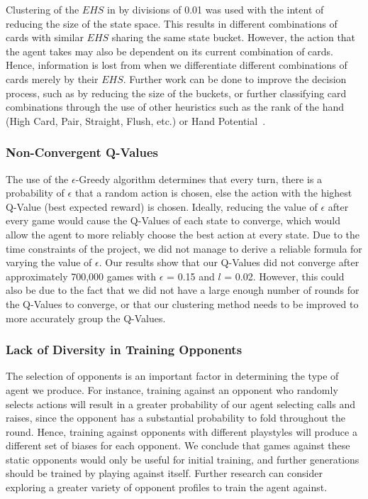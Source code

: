 \documentclass{article}
\begin{document}
Clustering of the $EHS$ in by divisions of 0.01 was used with the intent of reducing the size of the state space. This results in different combinations of cards with similar $EHS$ sharing the same state bucket. However, the action that the agent takes may also be dependent on its current combination of cards. Hence, information is lost from when we differentiate different combinations of cards merely by their $EHS$. Further work can be done to improve the decision process, such as by reducing the size of the buckets, or further classifying card combinations through the use of other heuristics such as the rank of the hand (High Card, Pair, Straight, Flush, etc.) or Hand Potential~\cite{trc:hs}.

\subsubsection{Non-Convergent Q-Values}

The use of the $\epsilon$-Greedy algorithm determines that every turn, there is a probability of $\epsilon$ that a random action is chosen, else the action with the highest Q-Value (best expected reward) is chosen. Ideally, reducing the value of $\epsilon$ after every game would cause the Q-Values of each state to converge, which would allow the agent to more reliably choose the best action at every state. Due to the time constraints of the project, we did not manage to derive a reliable formula for varying the value of $\epsilon$. Our results show that our Q-Values did not converge after approximately 700,000 games with $\epsilon$ = 0.15 and $l$ = 0.02. However, this could also be due to the fact that we did not have a large enough number of rounds for the Q-Values to converge, or that our clustering method needs to be improved to more accurately group the Q-Values.

\subsubsection{Lack of Diversity in Training Opponents}

The selection of opponents is an important factor in determining the type of agent we produce. For instance, training against an opponent who randomly selects actions will result in a greater probability of our agent selecting calls and raises, since the opponent has a substantial probability to fold throughout the round. Hence, training against opponents with different playstyles will produce a different set of biases for each opponent. We conclude that games against these static opponents would only be useful for initial training, and further generations should be trained by playing against itself. Further research can consider exploring a greater variety of opponent profiles to train the agent against.
\end{document}
